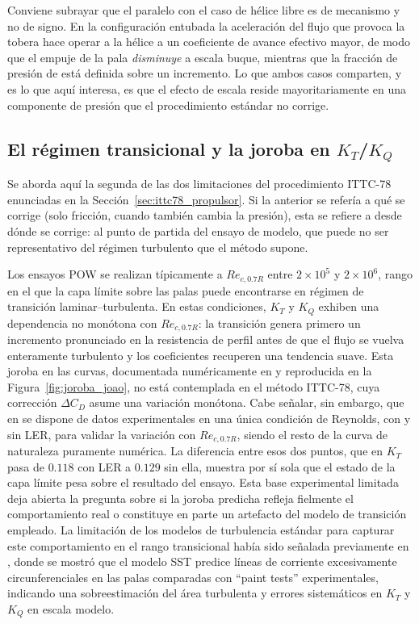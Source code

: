 Conviene subrayar que el paralelo con el caso de hélice libre es de mecanismo y no
de signo. En la configuración entubada la aceleración del flujo que provoca la
tobera hace operar a la hélice a un coeficiente de avance efectivo mayor, de modo
que el empuje de la pala \emph{disminuye} a escala buque, mientras que la fracción
de presión de \citet{gallotti2026} está definida sobre un incremento. Lo que
ambos casos comparten, y es lo que aquí interesa, es que el efecto de escala
reside mayoritariamente en una componente de presión que el procedimiento estándar
no corrige.
 
\subsection{El régimen transicional y la joroba en $K_T$/$K_Q$}
\label{sec:chichon_antec}
 
Se aborda aquí la segunda de las dos limitaciones del procedimiento ITTC-78 enunciadas en la Sección~\ref{sec:ittc78_propulsor}. Si la anterior se refería a qué se corrige (solo fricción, cuando también cambia la presión), esta se refiere a desde dónde se corrige: al punto de partida del ensayo de modelo, que puede no ser representativo del régimen turbulento que el método supone.

Los ensayos POW se realizan típicamente a $Re_{c,0.7R}$ entre $2\times10^5$ y $2\times10^6$, rango en el que la capa límite sobre las palas puede encontrarse en régimen de transición laminar--turbulenta. En estas condiciones, $K_T$ y $K_Q$ exhiben una dependencia no monótona con $Re_{c,0.7R}$: la transición genera primero un incremento pronunciado en la resistencia de perfil antes de que el flujo se vuelva enteramente turbulento y los coeficientes recuperen una tendencia suave. Esta joroba en las curvas, documentada numéricamente en \citet{baltazar2018transition} y reproducida en la Figura~\ref{fig:joroba_joao}, no está contemplada en el método ITTC-78, cuya corrección $\Delta C_D$ asume una variación monótona. Cabe señalar, sin embargo, que en \citet{baltazar2018transition} se dispone de datos experimentales en una única condición de Reynolds, con y sin LER, para validar la variación con $Re_{c,0.7R}$, siendo el resto de la curva de naturaleza puramente numérica. La diferencia entre esos dos puntos, que en $K_T$ pasa de $0.118$ con LER a $0.129$ sin ella, muestra por sí sola que el estado de la capa límite pesa sobre el resultado del ensayo. Esta base experimental limitada deja abierta la pregunta sobre si la joroba predicha refleja fielmente el comportamiento real o constituye en parte un artefacto del modelo de transición empleado. La limitación de los modelos de turbulencia estándar para capturar este comportamiento en el rango transicional había sido señalada previamente en \citet{rijpkema2015viscous}, donde se mostró que el modelo SST predice líneas de corriente excesivamente circunferenciales en las palas comparadas con ``paint tests'' experimentales, indicando una sobreestimación del área turbulenta y errores sistemáticos en $K_T$ y $K_Q$ en escala modelo.
 
